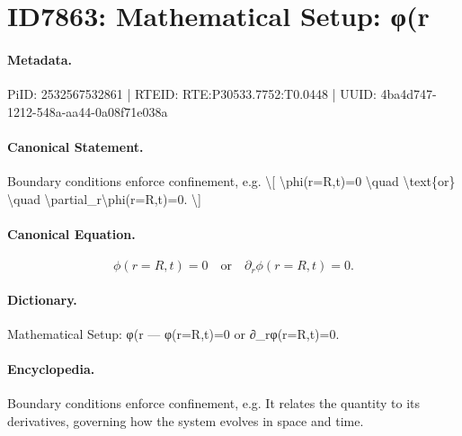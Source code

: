 \section*{ID7863: Mathematical Setup: φ(r}
\paragraph{Metadata.}
PiID: 2532567532861 | RTEID: RTE:P30533.7752:T0.0448 | UUID: 4ba4d747-1212-548a-aa44-0a08f71e038a

\paragraph{Canonical Statement.}
Boundary conditions enforce confinement, e.g. \textbackslash{}[ \textbackslash{}phi(r=R,t)=0 \textbackslash{}quad \textbackslash{}text\{or\} \textbackslash{}quad \textbackslash{}partial\_r\textbackslash{}phi(r=R,t)=0. \textbackslash{}]

\paragraph{Canonical Equation.}
\[
\phi(r=R,t)=0 \quad \text{or} \quad \partial_r\phi(r=R,t)=0.
\]

\paragraph{Dictionary.}
Mathematical Setup: φ(r — φ(r=R,t)=0 or ∂\_rφ(r=R,t)=0.

\paragraph{Encyclopedia.}
Boundary conditions enforce confinement, e.g. It relates the quantity to its derivatives, governing how the system evolves in space and time.

